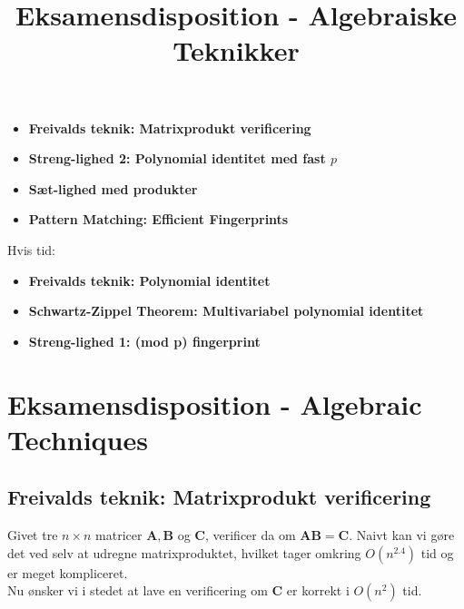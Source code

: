 
\title{Eksamensdisposition - Algebraiske Teknikker}


\maketitle

\begin{itemize}
  \item \textbf{Freivalds teknik: Matrixprodukt verificering}
  \item \textbf{Streng-lighed 2: Polynomial identitet med fast $p$}
  \item \textbf{Sæt-lighed med produkter}
  \item \textbf{Pattern Matching: Efficient Fingerprints}
\end{itemize}

Hvis tid:
\begin{itemize}
  \item \textbf{Freivalds teknik: Polynomial identitet}
  \item \textbf{Schwartz-Zippel Theorem: Multivariabel polynomial identitet}
  \item \textbf{Streng-lighed 1: (mod p) fingerprint}
\end{itemize}



\newpage
\section{Eksamensdisposition - Algebraic Techniques}
\subsection{Freivalds teknik: Matrixprodukt verificering}

Givet tre $n \times n$ matricer $\mathbf A, \mathbf B$ og $\mathbf C$, verificer da om $\mathbf{AB} = \mathbf C$. Naivt kan vi gøre det ved selv at udregne matrixproduktet, hvilket tager omkring $O(n^{2.4})$ tid og er meget kompliceret.\\

Nu ønsker vi i stedet at lave en verificering om $\mathbf C$ er korrekt i $O(n^2)$ tid.

